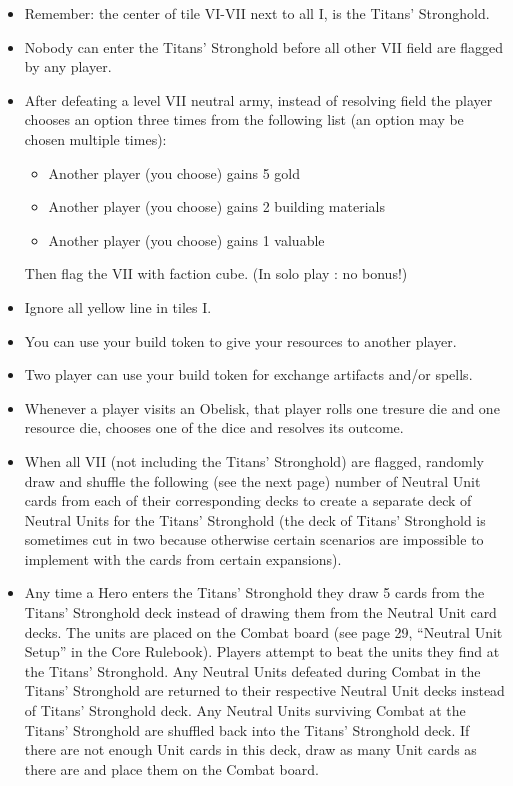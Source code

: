 \begin{itemize}
    \item Remember: the center of tile VI-VII next to all I, is the Titans' Stronghold.
    \item Nobody can enter the Titans' Stronghold before all other VII field are flagged by any player.
    \item After defeating a level VII neutral army, instead of resolving field the player chooses an option three times from the following list (an option may be chosen multiple times):
    \begin{itemize}
        \item Another player (you choose) gains 5 gold
        \item Another player (you choose) gains 2 building materials
        \item Another player (you choose) gains 1 valuable
    \end{itemize}
    Then flag the VII with faction cube.
    (In solo play : no bonus!)
    \item Ignore all yellow line in tiles I.
    \item You can use your build token to give your resources to another player.
    \item Two player can use your build token for exchange artifacts and/or spells.
    \item Whenever a player visits an Obelisk, that player rolls one tresure die and one resource die, chooses one of the dice and resolves its outcome.
    \item When all VII (not including the Titans' Stronghold) are flagged, randomly draw and shuffle the following (see the next page) number of Neutral Unit cards from each of their corresponding decks to create a separate deck of Neutral Units for the Titans' Stronghold (the deck of Titans' Stronghold is sometimes cut in two because otherwise certain scenarios are impossible to implement with the cards from certain expansions).
    \item Any time a Hero enters the Titans' Stronghold they draw 5 cards from the Titans' Stronghold deck instead of drawing them from the Neutral Unit card decks. The units are placed on the Combat board (see page 29, “Neutral Unit Setup” in the Core Rulebook). Players attempt to beat the units they find at the Titans' Stronghold. Any Neutral Units defeated during Combat in the Titans' Stronghold are returned to their respective Neutral Unit decks instead of Titans' Stronghold deck. Any Neutral Units surviving Combat at the Titans' Stronghold are shuffled back into the Titans' Stronghold deck. If there are not enough Unit cards in this deck, draw as many Unit cards as there are and place them on the Combat board.

\end{itemize}
